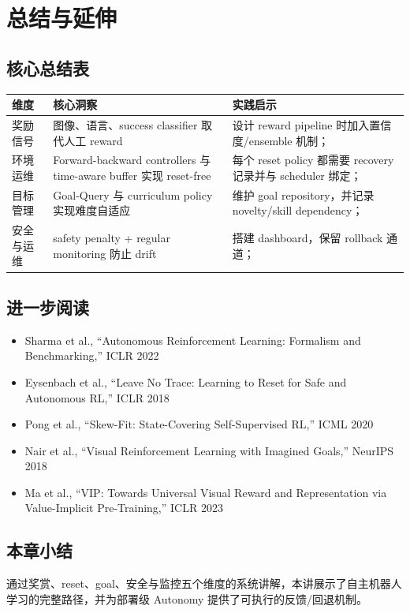 \section{总结与延伸}
\subsection{核心总结表}
\begin{tabularx}{\textwidth}{lXl}
\toprule
维度 & 核心洞察 & 实践启示 \\
\midrule
奖励信号 & 图像、语言、success classifier 取代人工 reward & 设计 reward pipeline 时加入置信度/ensemble 机制； \\
环境运维 & Forward-backward controllers 与 time-aware buffer 实现 reset-free & 每个 reset policy 都需要 recovery 记录并与 scheduler 绑定； \\
目标管理 & Goal-Query 与 curriculum policy 实现难度自适应 & 维护 goal repository，并记录 novelty/skill dependency； \\
安全与运维 & safety penalty + regular monitoring 防止 drift & 搭建 dashboard，保留 rollback 通道； \\
\bottomrule
\end{tabularx}

\subsection{进一步阅读}
\begin{itemize}
\item Sharma et al., ``Autonomous Reinforcement Learning: Formalism and Benchmarking,'' ICLR 2022
\item Eysenbach et al., ``Leave No Trace: Learning to Reset for Safe and Autonomous RL,'' ICLR 2018
\item Pong et al., ``Skew-Fit: State-Covering Self-Supervised RL,'' ICML 2020
\item Nair et al., ``Visual Reinforcement Learning with Imagined Goals,'' NeurIPS 2018
\item Ma et al., ``VIP: Towards Universal Visual Reward and Representation via Value-Implicit Pre-Training,'' ICLR 2023
\end{itemize}

\subsection{本章小结}
通过奖赏、reset、goal、安全与监控五个维度的系统讲解，本讲展示了自主机器人学习的完整路径，并为部署级 Autonomy 提供了可执行的反馈/回退机制。


